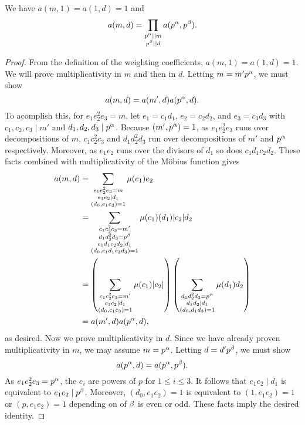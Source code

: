     \begin{proposition}\label{NFprop:multiplicativity_of_weighting_coefficients}
        We have $a(m,1) = a(1,d) = 1$ and
        \[
            a(m,d) = \prod_{\substack{p^{\alpha} \mid\mid m \\ p^{\beta} \mid\mid d}}a(p^{\alpha},p^{\beta}).
        \]
    \end{proposition}
    \begin{proof}
        From the definition of the weighting coefficients, $a(m,1) = a(1,d) = 1$. We will prove multiplicativity in $m$ and then in $d$. Letting $m = m'p^{\alpha}$, we must show
        \[
            a(m,d) = a(m',d)a(p^{\alpha},d).
        \]
        To acomplish this, for $e_{1}e_{2}^{2}e_{3} = m$, let $e_{1} = c_{1}d_{1}$, $e_{2} = c_{2}d_{2}$, and $e_{3} = c_{3}d_{3}$ with $c_{1},c_{2},c_{3} \mid m'$ and $d_{1},d_{2},d_{3} \mid p^{\alpha}$. Because $(m',p^{\alpha}) = 1$, as $e_{1}e_{2}^{2}e_{3}$ runs over decompositions of $m$, $c_{1}c_{2}^{2}c_{3}$ and $d_{1}d_{2}^{2}d_{3}$ run over decompositions of $m'$ and $p^{\alpha}$ respectively. Moreover, as $e_{1}e_{2}$ runs over the divisors of $d_{1}$ so does $c_{1}d_{1}c_{2}d_{2}$. These facts combined with multiplicativity of the M\"obius function gives
        \begin{align*}
            a(m,d) &= \sum_{\substack{e_{1}e_{2}^{2}e_{3} = m \\ e_{1}e_{2} \mid d_{1} \\ (d_{0},e_{1}e_{3}) = 1}}\mu(e_{1})e_{2} \\
            &= \sum_{\substack{c_{1}c_{2}^{2}c_{3} = m' \\ d_{1}d_{2}^{2}d_{3} = p^{\beta} \\ c_{1}d_{1}c_{2}d_{2} \mid d_{1} \\ (d_{0},c_{1}d_{1}c_{3}d_{3}) = 1}}\mu(c_{1})(d_{1})|c_{2}|d_{2} \\
            &= \left(\sum_{\substack{c_{1}c_{2}^{2}c_{3} = m' \\ c_{1}c_{2} \mid d_{1} \\ (d_{0},c_{1}c_{3}) = 1}}\mu(c_{1})|c_{2}|\right)\left(\sum_{\substack{d_{1}d_{2}^{2}d_{3} = p^{\alpha} \\ d_{1}d_{2} \mid d_{1} \\ (d_{0},d_{1}d_{3}) = 1}}\mu(d_{1})d_{2}\right) \\
            &= a(m',d)a(p^{\alpha},d),
        \end{align*}
        as desired. Now we prove multiplicativity in $d$. Since we have already proven multiplicativity in $m$, we may assume $m = p^{\alpha}$. Letting $d = d'p^{\beta}$, we must show
        \[
            a(p^{\alpha},d) = a(p^{\alpha},p^{\beta}).
        \]
        As $e_{1}e_{2}^{2}e_{3} = p^{\alpha}$, the $e_{i}$ are powers of $p$ for $1 \le i \le 3$. It follows that $e_{1}e_{2} \mid d_{1}$ is equivalent to $e_{1}e_{2} \mid p^{\beta}$. Moreover, $(d_{0},e_{1}e_{2}) = 1$ is equivalent to $(1,e_{1}e_{2}) = 1$ or $(p,e_{1}e_{2}) = 1$ depending on of $\beta$ is even or odd. These facts imply the desired identity.
    \end{proof}


